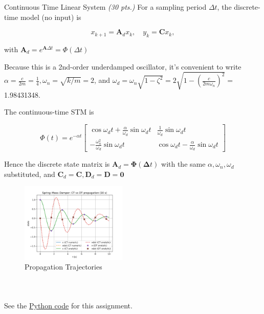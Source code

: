 \begin{hwkProblem}{2}{Continuous Time Linear System \textit{(30 pts.)}}
	For a sampling period \(\Delta t\), the discrete-time model (no input) is

	\[
		x_{k+1}=\mathbf{A}_d x_k, \quad y_k=\mathbf{C} x_k,
	\]

	with \(\mathbf{A}_d=e^{\mathbf{A} \Delta t}=\Phi(\Delta t)\)

	Because this is a 2nd-order underdamped oscillator, it's convenient to write \(\alpha= \frac{c}{2 m}=\frac{1}{4}, \omega_n=\sqrt{k / m}=2\), and \(\omega_d=\omega_n \sqrt{1-\zeta^2}=2 \sqrt{1-\left(\frac{c}{2 m \omega_n}\right)^2}=\) 1.98431348.

	The continuous-time STM is

	\[
		\Phi(t)=e^{-\alpha t}\left[\begin{array}{cc}
				\cos{\omega_d t}+\frac{\alpha}{\omega_d} \sin{\omega_d t} & \frac{1}{\omega_d} \sin{\omega_d t}                       \\
				-\frac{\omega_n^2}{\omega_d} \sin{\omega_d t}             & \cos{\omega_d t}-\frac{\alpha}{\omega_d} \sin{\omega_d t}
			\end{array}\right]
	\]

	Hence the discrete state matrix is \(\mathbf{A}_d=\boldsymbol{\Phi}(\boldsymbol{\Delta} t)\) with the same \(\alpha, \omega_n, \omega_d\) substituted, and \(\mathbf{C}_d=\mathbf{C}, \mathbf{D}_d=\mathbf{D}=\mathbf{0}\)
	
	\pagebreak

	\hwkPart{} \label{hwk:s02b}

	\begin{figure}[H] \label{fig:s02b}
		\begin{center}
			\includegraphics[width=0.45\textwidth]{./outputs/figures/s02b.png}
		\end{center}
		\caption{Propagation Trajectories}
	\end{figure}

	\hwkPart{} \label{hwk:s02c}

	\inputminted{python}{./outputs/text/s02c.txt}

	\hwkPart{} \label{hwk:s02d}

	\inputminted{python}{./outputs/text/s02d.txt}

	\hwkPart{} \label{hwk:s02e}

	\inputminted{python}{./outputs/text/s02e.txt}

	\hwkCode{} \label{code:s02}

	See the \href{https://www.github.com/vaisriv/enae441-hw03/blob/main/src/hw03.py#L234}{Python code} for this assignment.

\end{hwkProblem}

